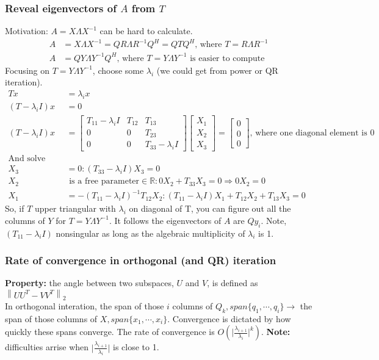 \documentclass{article}
\newcommand{\norm}[2]{\left\lVert#1\right\rVert_#2}
\newcommand{\abs}[1]{\lvert#1\rvert}
\begin{document}
\subsubsection{Reveal eigenvectors of $A$ from $T$}
Motivation: $A = X\Lambda X^{-1}$ can be hard to calculate.
\begin{align*}
    A &= X\Lambda X^{-1} = QR \Lambda R^{-1}Q^H = QTQ^H \textrm{, where } T = R\Lambda R^{-1}\\
    A &= QY\Lambda Y^{-1}Q^H \textrm{, where $T = Y \Lambda Y^{-1}$ is easier to compute}
\end{align*}
Focusing on $T = Y \Lambda Y^{-1}$, choose some $\lambda_i$ (we could get from power or QR iteration). 
\begin{align*}
    Tx &= \lambda_i x\\
    (T - \lambda_i I)x &= 0\\
    (T - \lambda_i I)x  &= \begin{bmatrix} T_{11} - \lambda_i I & T_{12} & T_{13}\\ 0 & 0 & T_{23}\\
            0 & 0 & T_{33} - \lambda_i I \end{bmatrix} \begin{bmatrix} X_1 \\ X_2 \\ X_3 \end{bmatrix} = \begin{bmatrix} 0 \\ 0 \\ 0 \end{bmatrix} \textrm{, where one diagonal element is 0}\\
    \textrm{And solve with back substitution:}&\\
            X_3 &= 0: (T_{33} - \lambda_i I) X_3 = 0\\
            X_2 &\textrm{ is a free parameter} \in \mathbb{R}: 0X_2 + T_{33}X_3 = 0 \Longrightarrow 0X_2 = 0\\
            X_1 &= -(T_{11}-\lambda_i I)^{-1}T_{12}X_2: (T_{11}-\lambda_i I)X_1 + T_{12}X_2 + T_{13}X_3 = 0
\end{align*}
So, if $T$ upper triangular with $\lambda_i$ on diagonal of T, you can figure out all the columns of $Y$ for $T = Y\Lambda Y^{-1}$. It follows the eigenvectors of $A$ are $Qy_i$. Note, $(T_{11} - \lambda_i I)$ nonsingular as long as the algebraic multiplicity of $\lambda_i$ is 1.


\subsubsection{Rate of convergence in orthogonal (and QR) iteration}
\textbf{Property:} the angle between two subspaces, $U$ and $V$, is defined as $\norm{UU^T - VV^T}{2}$\\
\noindent In orthogonal interation, the span of those $i$ columns of $Q_k, span\{q_1, \cdots, q_i\} \longrightarrow$ the span of those columns of $X, span \{x_1, \cdots, x_i\}$. Convergence is dictated by how quickly these spans converge. The rate of convergence is $O(\abs{\frac{\lambda_{i+1}}{\lambda_i}}^k)$. \textbf{Note:} difficulties arrise when $\abs{\frac{\lambda_{i+1}}{\lambda_i}}$ is close to 1.
\end{document}
